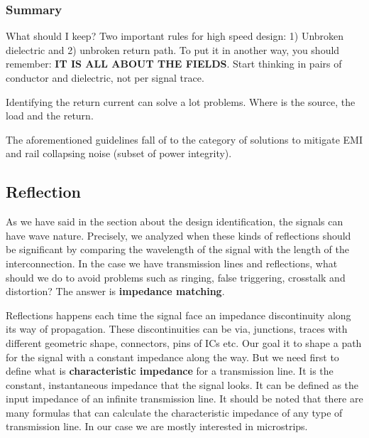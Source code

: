 \documentclass[12pt]{article}
\begin{document}
\subsubsection{Summary}

What should I keep? Two important rules for high speed design: 1) Unbroken dielectric and 2) unbroken return path.
To put it in another way, you should remember: \textbf{IT IS ALL ABOUT THE FIELDS}. Start thinking in pairs of conductor and dielectric, not per signal trace.

Identifying the return current can solve a lot problems. Where is the source, the load and the return.


The aforementioned guidelines fall of to the category of solutions to mitigate EMI and rail collapsing noise (subset of power integrity).

\subsection{Reflection}

As we have said in the section about the design identification, the signals can have wave nature. Precisely, we analyzed when these kinds of reflections should be significant by comparing the wavelength of the signal with the length of the interconnection. In the case we have transmission lines and reflections, what should we do to avoid problems such as ringing, false triggering, crosstalk and distortion? The answer is \textbf{impedance matching}.

Reflections happens each time the signal face an impedance discontinuity along its way of propagation. These discontinuities can be via, junctions, traces with different geometric shape, connectors, pins of ICs etc. Our goal it to shape a path for the signal with a constant impedance along the way. But we need first to define what is \textbf{characteristic impedance} for a transmission line. It is the constant, instantaneous impedance that the signal looks. It can be defined as the input impedance of an infinite transmission line. It should be noted that there are many formulas that can calculate the characteristic impedance of any type of transmission line. In our case we are mostly interested in microstrips.
\end{document}
